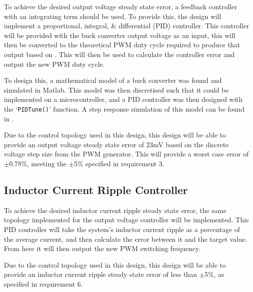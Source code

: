 To achieve the desired output voltage steady state error, a feedback controller with an integrating term should be used. To provide this, the design will implement a proportional, integral, \& differential (PID) controller. This controller will be provided with the buck converter output voltage as an input, this will then be converted to the theoretical PWM duty cycle required to produce that output based on . This will then be used to calculate the controller error and output the new PWM duty cycle.

To design this, a mathematical model of a buck converter \cite{Patil2015} was found and simulated in Matlab. This model was then discretised such that it could be implemented on a microcontroller, and a PID controller was then designed with the `\lstinline{PIDTune()}' function. A step response simulation of this model can be found in . 

Due to the control topology used in this design, this design will be able to provide an output voltage steady state error of 23mV based on the discrete voltage step size from the PWM generator. This will provide a worst case error of $\pm$0.78\%, meeting the $\pm$5\% specified in requirement 3.

\newpage
\subsection{Inductor Current Ripple Controller}\label{S:ripple_control_design}

To achieve the desired inductor current ripple steady state error, the same topology implemented for the output voltage controller will be implemented. This PID controller will take the system's inductor current ripple as a percentage of the average current, and then calculate the error between it and the target value. From here it will then output the new PWM switching frequency. 

Due to the control topology used in this design, this design will be able to provide an inductor current ripple steady state error of less than $\pm$5\%, as specified in requirement 6.




